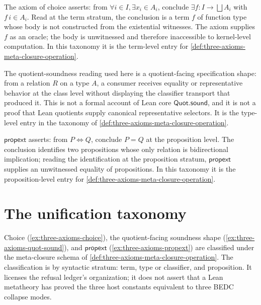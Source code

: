 \begin{example}
\label{ex:three-axioms-choice}
The axiom of choice asserts: from $\forall i \in I, \exists x_i \in A_i$, conclude $\exists f \colon I \to \bigsqcup A_i$ with $f\,i \in A_i$. Read at the term stratum, the conclusion is a term $f$ of function type whose body is not constructed from the existential witnesses. The axiom supplies $f$ as an oracle; the body is unwitnessed and therefore inaccessible to kernel-level computation. In this taxonomy it is the term-level entry for \autoref{def:three-axioms-meta-closure-operation}.
\end{example}

\begin{example}
\label{ex:three-axioms-quot-sound}
The quotient-soundness reading used here is a quotient-facing specification shape: from a relation $R$ on a type $A$, a consumer receives equality or representative behavior at the class level without displaying the classifier transport that produced it. This is not a formal account of Lean core $\mathsf{Quot.sound}$, and it is not a proof that Lean quotients supply canonical representative selectors. It is the type-level entry in the taxonomy of \autoref{def:three-axioms-meta-closure-operation}.
\end{example}

\begin{example}
\label{ex:three-axioms-propext}
$\mathsf{propext}$ asserts: from $P \Leftrightarrow Q$, conclude $P = Q$ at the proposition level. The conclusion identifies two propositions whose only relation is bidirectional implication; reading the identification at the proposition stratum, $\mathsf{propext}$ supplies an unwitnessed equality of propositions. In this taxonomy it is the proposition-level entry for \autoref{def:three-axioms-meta-closure-operation}.
\end{example}

\section{The unification taxonomy}
\label{sec:three-axioms-unification}

\begin{principle}
\label{thm:three-axioms-unification}
Choice (\autoref{ex:three-axioms-choice}), the quotient-facing soundness shape (\autoref{ex:three-axioms-quot-sound}), and $\mathsf{propext}$ (\autoref{ex:three-axioms-propext}) are classified under the meta-closure schema of \autoref{def:three-axioms-meta-closure-operation}. The classification is by syntactic stratum: term, type or classifier, and proposition. It licenses the refusal ledger's organization; it does not assert that a Lean metatheory has proved the three host constants equivalent to three BEDC collapse modes.
\end{principle}

